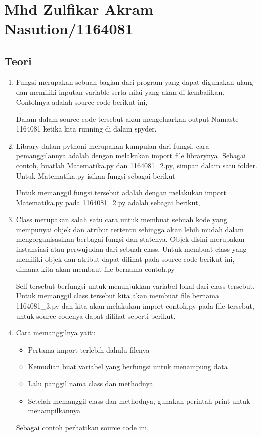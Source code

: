 \section{Mhd Zulfikar Akram Nasution/1164081}
\subsection{Teori}
\begin{enumerate}
\item Fungsi merupakan sebuah bagian dari program yang dapat digunakan ulang dan memiliki inputan variable serta nilai yang akan di kembalikan. Contohnya adalah source code berikut ini,
	 
Dalam dalam source code tersebut akan mengeluarkan output Namaste 1164081 ketika kita running di dalam spyder.

\item Library dalam pythoni merupakan kumpulan dari fungsi, cara pemanggilannya adalah dengan melakukan import file librarynya. Sebagai contoh, buatlah Matematika.py dan 1164081\_2.py, simpan dalam satu folder. Untuk Matematika.py isikan fungsi sebagai berikut
	 
Untuk memanggil fungsi tersebut adalah dengan melakukan import  Matematika.py pada 1164081\_2.py adalah sebagai berikut,
	 

\item Class merupakan salah satu cara untuk membuat sebuah kode yang mempunyai objek dan atribut tertentu sehingga akan lebih mudah dalam mengorganisasikan berbagai fungsi dan statenya. Objek disini merupakan instansiasi atau perwujudan dari sebuah class. Untuk membuat class yang memiliki objek dan atribut dapat dilihat pada source code berikut ini, dimana kita akan membaut file bernama contoh.py
	
Self tersebut berfungsi untuk menunjukkan variabel lokal dari class tersebut. Untuk memanggil class tersebut kita akan membuat file bernama 1164081\_3.py dan kita akan melakukan import contoh.py pada file tersebut, untuk source codenya dapat dilihat seperti berikut,
	

\item Cara memanggilnya yaitu
	\begin{itemize}
		\item Pertama import terlebih dahulu filenya
		\item Kemudian buat variabel yang berfungsi untuk menampung data
		\item Lalu panggil nama class dan methodnya
		\item Setelah memanggil class dan methodnya, gunakan perintah print untuk menampilkannya
	\end{itemize}
Sebagai contoh perhatikan source code ini,
	


\end{enumerate}
